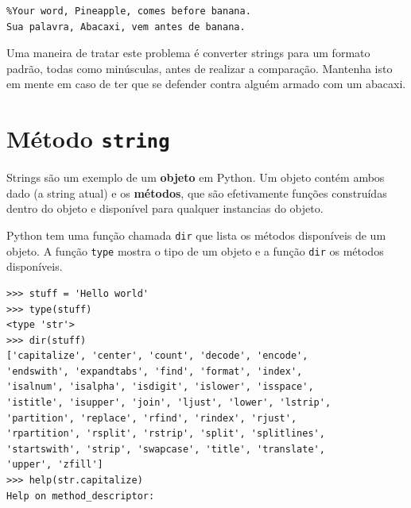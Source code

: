 {\beforeverb
\begin{verbatim}
%Your word, Pineapple, comes before banana.
Sua palavra, Abacaxi, vem antes de banana.
\end{verbatim}
\afterverb
%
%
Uma maneira de tratar este problema é converter strings para um formato
padrão, todas como minúsculas, antes de realizar a comparação. Mantenha isto
em mente em caso de ter que se defender contra alguém armado com um abacaxi.

\section{Método {\tt string}}

Strings são um exemplo de um {\bf objeto} em Python. Um objeto contém ambos
dado (a string atual) e os {\bf métodos}, que são efetivamente funções
construídas dentro do objeto e disponível para qualquer instancias do objeto.


Python tem uma função chamada {\tt dir} que lista os métodos disponíveis de
um objeto. A função {\tt type} mostra o tipo de um objeto e a função {\tt dir}
os métodos disponíveis.

\beforeverb
\begin{verbatim}
>>> stuff = 'Hello world'
>>> type(stuff)
<type 'str'>
>>> dir(stuff)
['capitalize', 'center', 'count', 'decode', 'encode',
'endswith', 'expandtabs', 'find', 'format', 'index',
'isalnum', 'isalpha', 'isdigit', 'islower', 'isspace',
'istitle', 'isupper', 'join', 'ljust', 'lower', 'lstrip',
'partition', 'replace', 'rfind', 'rindex', 'rjust',
'rpartition', 'rsplit', 'rstrip', 'split', 'splitlines',
'startswith', 'strip', 'swapcase', 'title', 'translate',
'upper', 'zfill']
>>> help(str.capitalize)
Help on method_descriptor:


\end{verbatim}}
